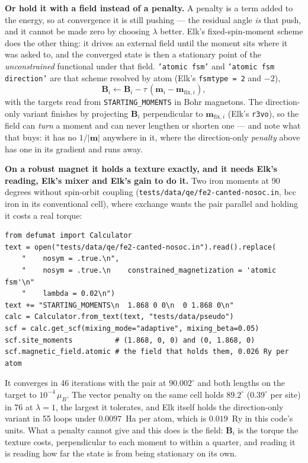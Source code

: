 \documentclass[11pt,a4paper]{article}
\newcommand{\code}[1]{\texttt{\small #1}}
\begin{document}
\textbf{Or hold it with a field instead of a penalty.} A penalty is a term
added to the energy, so at convergence it is still pushing --- the residual
angle \emph{is} that push, and it cannot be made zero by choosing $\lambda$
better. Elk's fixed-spin-moment scheme does the other thing: it drives an
external field until the moment sits where it was asked to, and the converged
state is then a stationary point of the \emph{unconstrained} functional under
that field. \code{'atomic fsm'} and \code{'atomic fsm direction'} are that
scheme resolved by atom (Elk's \code{fsmtype = 2} and $-2$),
%
\[
  \mathbf B_i \leftarrow \mathbf B_i - \tau\,(\mathbf m_i - \mathbf m_{\mathrm{fix},i}),
\]
%
with the targets read from \code{STARTING\_MOMENTS} in Bohr magnetons. The
direction-only variant finishes by projecting $\mathbf B_i$ perpendicular to
$\mathbf m_{\mathrm{fix},i}$ (Elk's \code{r3vo}), so the field can \emph{turn} a
moment and can never lengthen or shorten one --- and note what that buys: it has
no $1/|\mathbf m|$ anywhere in it, where the direction-only \emph{penalty} above
has one in its gradient and runs away.

\textbf{On a robust magnet it holds a texture exactly, and it needs Elk's
reading, Elk's mixer and Elk's gain to do it.} Two iron moments at 90 degrees
without spin-orbit coupling (\code{tests/data/qe/fe2-canted-nosoc.in}, bcc iron
in its conventional cell), where exchange wants the pair parallel and holding it
costs a real torque:
%
\begin{verbatim}
from defumat import Calculator
text = open("tests/data/qe/fe2-canted-nosoc.in").read().replace(
    "    nosym = .true.\n",
    "    nosym = .true.\n    constrained_magnetization = 'atomic fsm'\n"
    "    lambda = 0.02\n")
text += "STARTING_MOMENTS\n  1.868 0 0\n  0 1.868 0\n"
calc = Calculator.from_text(text, "tests/data/pseudo")
scf = calc.get_scf(mixing_mode="adaptive", mixing_beta=0.05)
scf.site_moments          # (1.868, 0, 0) and (0, 1.868, 0)
scf.magnetic_field.atomic # the field that holds them, 0.026 Ry per atom
\end{verbatim}
%
It converges in 46 iterations with the pair at $90.002^\circ$ and both lengths on
the target to $10^{-4}\,\mu_B$. The vector penalty on the same cell holds
$89.2^\circ$ ($0.39^\circ$ per site) in 76 at $\lambda = 1$, the largest it
tolerates, and Elk itself holds the direction-only variant in 55 loops under
$0.0097$~Ha per atom, which is $0.019$~Ry in this code's units. What a penalty
cannot give and this does is the field: $\mathbf B_i$ is the torque the texture
costs, perpendicular to each moment to within a quarter, and reading it is
reading how far the state is from being stationary on its own.
\end{document}
